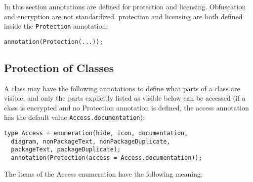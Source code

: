 In this section annotations are defined for protection and
licensing. Obfuscation and encryption are not standardized.
protection and licensing are both defined inside the
\lstinline!Protection! annotation:

\begin{lstlisting}[language=modelica]
annotation(Protection(...));
\end{lstlisting}

\subsection{Protection of Classes}

A class may have the following annotations to define what parts of a
class are visible, and only the parts explicitly listed as visible below can be accessed
(if a class is encrypted and no Protection annotation is defined, the access annotation has the default value
\lstinline!Access.documentation!):

\begin{lstlisting}[language=modelica]
  type Access = enumeration(hide, icon, documentation,
  diagram, nonPackageText, nonPackageDuplicate,
  packageText, packageDuplicate);
  annotation(Protection(access = Access.documentation));
\end{lstlisting}
The items of the Access enumeration have the following meaning:

